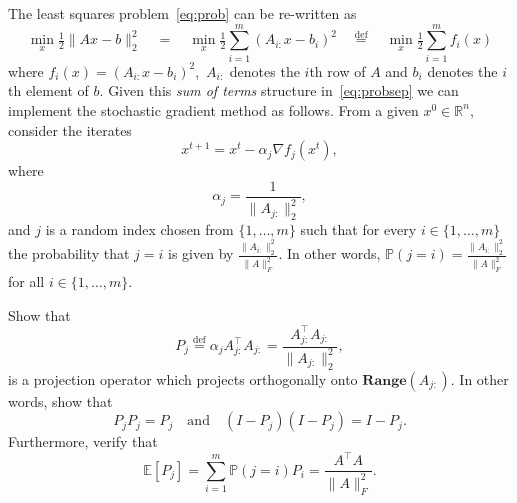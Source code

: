 \documentclass[11pt]{article}
\newcommand{\R}{\mathbb{R}}
\newcommand{\eqdef}{\overset{\text{def}}{=}}
\newcommand{\E}[1]{\mathbb{E}\left[#1\right] }
\newcommand{\norm}[1]{\lVert#1\rVert}
\providecommand{\Range}[1]{\mathbf{Range}\left( #1\right)}
\begin{document}
\begin{ExerciseList}
    \Exercise The least squares problem~\eqref{eq:prob} can be re-written as
    \begin{equation} \label{eq:probsep}
    \min_x \tfrac{1}{2}\norm{Ax-b}_2^2\quad = \quad \min_x \tfrac{1}{2}\sum_{i=1}^m (A_{i:}x - b_i)^2 \quad \eqdef \quad \min_x\tfrac{1}{2}\sum_{i=1}^m f_i(x)
    \end{equation}
    where $f_i(x) = (A_{i:}x - b_i)^2$,\, $A_{i:}$ denotes the $i$th row of $A$ and $b_i$ denotes the $i$th element of $b.$
    Given this \emph{sum of terms} structure in~\eqref{eq:probsep} we can implement the stochastic gradient method as follows.
    From a given $x^0 \in \R^n$,  consider the iterates
\begin{equation}\label{eq:stochgrad} x^{t+1}=x^t - \alpha_j \nabla f_j(x^t),\end{equation}
where 
\begin{equation} \label{eq:alpha2}
\alpha_j =  \frac{1}{\norm{A_{j:}}_2^2},\end{equation}
   and $j$ is a random index chosen from $\{1,\ldots, m\}$ such that for every $i \in \{1,\ldots, m\}$ the probability that
$j =i$ is  given by  $ \frac{\norm{A_{i:}}_2^2}{\norm{A}_F^2}.$ In other words,
    $\mathbb{P}(j=i) = \frac{\norm{A_{i:}}_2^2}{\norm{A}_F^2} $ for all $i \in \{1,\ldots, m \}$. 

 \ExePart \label{I} Show that
 \begin{equation}\label{eq:P} P_j \eqdef \alpha_j A_{j:}^\top A_{j:} = \frac{A_{j:}^\top A_{j:}}{\norm{A_{j:}}_2^2},\end{equation}
is a projection operator which projects orthogonally onto $\Range{A_{j:}}.$ In other words, show that
 \begin{equation}\label{eq:PP} P_jP_j =P_j \quad \mbox{and} \quad (I-P_j)(I-P_j) = I-P_j.\end{equation}
 Furthermore, verify that
\begin{equation}
\label{eq:EP}\E{P_j} = \sum_{i=1}^m \mathbb{P}(j=i) P_i = \frac{A^\top A}{\norm{A}_F^2}.
\end{equation} 



\end{ExerciseList}
\end{document}
